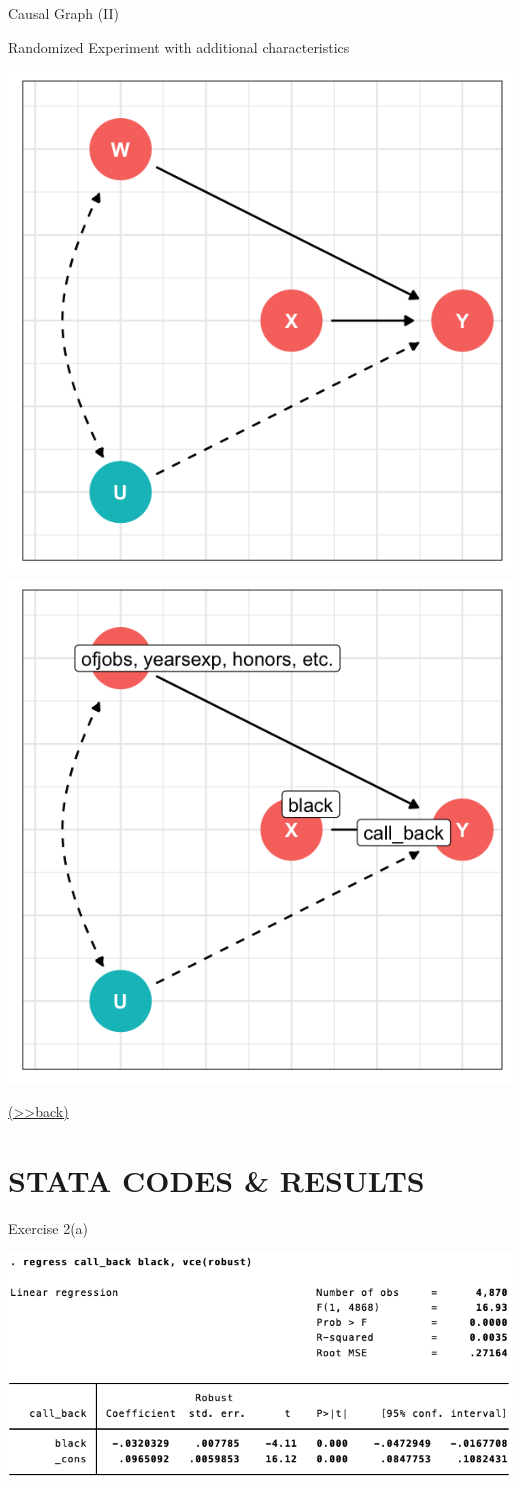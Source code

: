 \documentclass[
  10pt,
  ignorenonframetext,
]{beamer}
\begin{document}
\begin{frame}{Causal Graph (II)}
\protect\hypertarget{RCTC}{}
\begin{block}{Randomized Experiment with additional characteristics}
\protect\hypertarget{randomized-experiment-with-additional-characteristics}{}
\begin{center}\includegraphics[width=0.4\linewidth,height=0.54\textheight]{pictures/RCTCsetting1} \includegraphics[width=0.4\linewidth,height=0.54\textheight]{pictures/RCTCsetting2} \end{center}

\footnotesize\protect\hyperlink{RCTQ}{(\textgreater\textgreater back)}
\normalsize
\end{block}
\end{frame}

\hypertarget{stata-codes-results}{%
\section{STATA CODES \& RESULTS}\label{stata-codes-results}}

\begin{frame}{Exercise 2(a)}
\protect\hypertarget{res1-regBlack}{}
\begin{center}\includegraphics[width=1\linewidth]{pictures/res1-regBlack} \end{center}
\end{frame}
\end{document}
